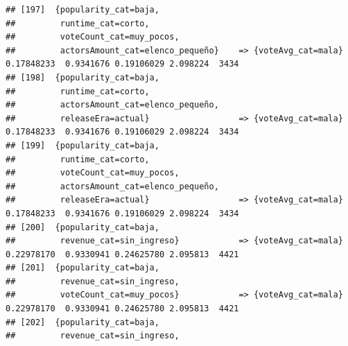 \documentclass[
]{article}
\begin{document}
\begin{verbatim}
## [197]  {popularity_cat=baja,                                                                                                    
##         runtime_cat=corto,                                                                                                      
##         voteCount_cat=muy_pocos,                                                                                                
##         actorsAmount_cat=elenco_pequeño}    => {voteAvg_cat=mala}                0.17848233  0.9341676 0.19106029 2.098224  3434
## [198]  {popularity_cat=baja,                                                                                                    
##         runtime_cat=corto,                                                                                                      
##         actorsAmount_cat=elenco_pequeño,                                                                                        
##         releaseEra=actual}                  => {voteAvg_cat=mala}                0.17848233  0.9341676 0.19106029 2.098224  3434
## [199]  {popularity_cat=baja,                                                                                                    
##         runtime_cat=corto,                                                                                                      
##         voteCount_cat=muy_pocos,                                                                                                
##         actorsAmount_cat=elenco_pequeño,                                                                                        
##         releaseEra=actual}                  => {voteAvg_cat=mala}                0.17848233  0.9341676 0.19106029 2.098224  3434
## [200]  {popularity_cat=baja,                                                                                                    
##         revenue_cat=sin_ingreso}            => {voteAvg_cat=mala}                0.22978170  0.9330941 0.24625780 2.095813  4421
## [201]  {popularity_cat=baja,                                                                                                    
##         revenue_cat=sin_ingreso,                                                                                                
##         voteCount_cat=muy_pocos}            => {voteAvg_cat=mala}                0.22978170  0.9330941 0.24625780 2.095813  4421
## [202]  {popularity_cat=baja,                                                                                                    
##         revenue_cat=sin_ingreso,                                                                                                

\end{verbatim}
\end{document}
